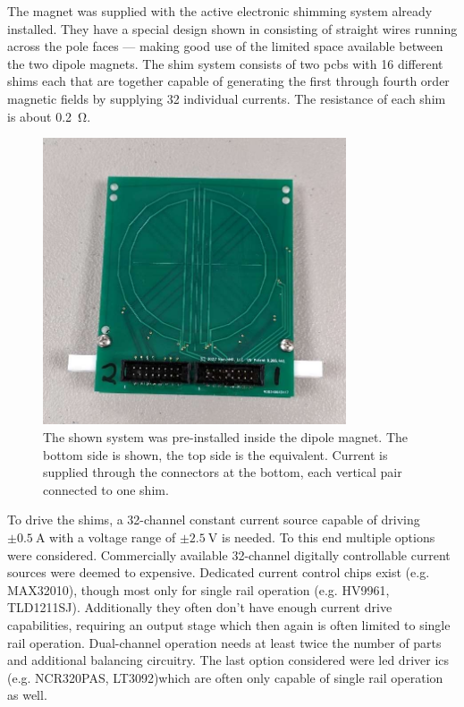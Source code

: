 The magnet was supplied with the active electronic shimming system already installed. They have a special design shown in  consisting of straight wires running across the pole faces --- making good use of the limited space available between the two dipole magnets. The shim system consists of two \acrshort{pcb}s with 16 different shims each that are together capable of generating the first through fourth order magnetic fields by supplying 32 individual currents. The resistance of each shim is about \qty{0.2}{\ohm}.

\begin{figure}[hbt]
    \centering
    \includegraphics[width=0.8\textwidth]{images/shims.png}
    \caption{ The shown system was pre-installed inside the dipole magnet. The bottom side is shown, the top side is the equivalent. Current is supplied through the connectors at the bottom, each vertical pair connected to one shim.}
\end{figure}

To drive the shims, a 32-channel constant current source capable of driving \(\pm{} \qty{0.5}{\ampere}\) with a voltage range of \(\pm{} \qty{2.5}{\volt}\) is needed. To this end multiple options were considered. Commercially available 32-channel digitally controllable current sources were deemed to expensive. Dedicated current control chips exist (e.g. MAX32010), though most only for single rail operation (e.g. HV9961, TLD1211SJ). Additionally they often don't have enough current drive capabilities, requiring an output stage which then again is often limited to single rail operation. Dual-channel operation needs at least twice the number of parts and additional balancing circuitry. The last option considered were \acrshort{led} driver \acrshort{ic}s (e.g. NCR320PAS, LT3092)which are often only capable of single rail operation as well.

